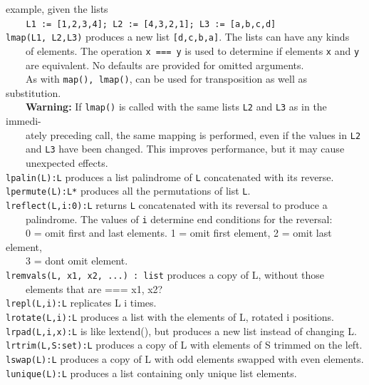 example, given the lists\\
 \ \texttt{\ \ \ }\texttt{L1 := [1,2,3,4]; L2 := [4,3,2,1]; L3 :=
[{\textquotedbl}a{\textquotedbl},{\textquotedbl}b{\textquotedbl},{\textquotedbl}c{\textquotedbl},{\textquotedbl}d{\textquotedbl}]}\\
 \texttt{lmap(L1, L2,L3)} produces a new list
\texttt{[{\textquotedbl}d{\textquotedbl},{\textquotedbl}c{\textquotedbl},{\textquotedbl}b{\textquotedbl},{\textquotedbl}a{\textquotedbl}]}.
The lists can have any kinds\\
 \ \ \ \ of elements. The operation \texttt{x === y} is used to
determine if elements \texttt{x} and \texttt{y}\\
 \ \ \ \ are equivalent. No defaults are provided for omitted arguments.\\
 \ \ \ \ As
with \texttt{map(), lmap()}, can be used for transposition as well as substitution.\\
 \ \ \ \ \textbf{Warning: }If \texttt{lmap()} is called with
 the same lists \texttt{L2} and \texttt{L3} as in the
immedi-\\
 \ \ \ \ ately preceding call, the same mapping is performed, even if
 the values in \texttt{L2} \\
 \ \ \ \ and \texttt{L3} have been changed. This improves performance,
 but it may cause \\
 \ \ \ \ unexpected effects. \\
\texttt{lpalin(L):L} produces a list palindrome of \texttt{L}
concatenated with its reverse.\\
\texttt{lpermute(L):L*} produces all the permutations of list
\texttt{L}.\\
\texttt{lreflect(L,i:0):L} returns \texttt{L} concatenated with its
reversal to produce a\\
 \ \ \ \ palindrome. The values of \texttt{i} determine
{\textquotedbl}end conditions{\textquotedbl} for the reversal:\\
 \ \ \ \ 0 = omit first and last elements. 1 = omit first element, 2 =
omit last element,\\
 \ \ \ \ 3 = don{\textquotesingle}t omit element.\\
\texttt{lremvals(L, x1, x2, ...) : list} produces a copy of L, without
those\\
 \ \ \ \ elements that are === x1, x2?\\
\texttt{lrepl(L,i):L} replicates L i
times.\\
\texttt{lrotate(L,i):L} produces a list with the elements of L, rotated i
positions.\\
\texttt{lrpad(L,i,x):L} is like lextend(), but produces a new list instead of
changing L.\\
\texttt{lrtrim(L,S:set):L} produces a copy of L with elements of S trimmed on
 the left.\\
\texttt{lswap(L):L} produces a copy of L with odd elements swapped with even
elements.\\
\texttt{lunique(L):L} produces a list containing only unique list elements.


